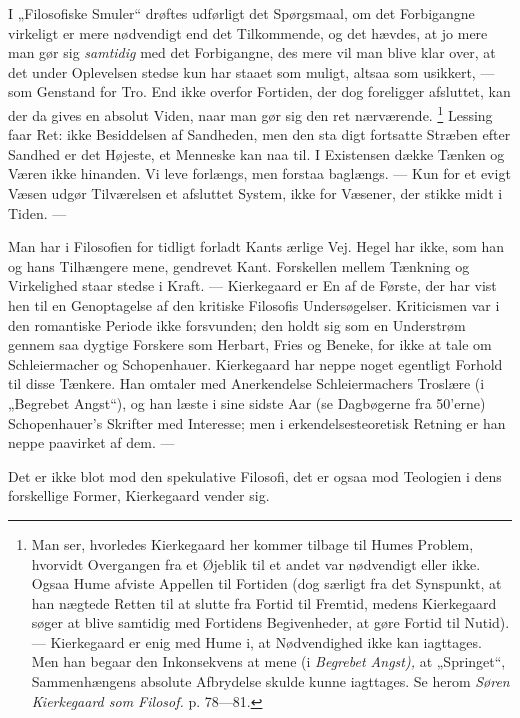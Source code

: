 \documentclass[12pt,a4paper,openany]{book}
\newcommand{\opage}[1]{\marginnote{\footnotesize\textit{[#1]}}}
\begin{document}
I „Filosofiske Smuler“ drøftes udførligt det Spørgsmaal, om det Forbigangne
virkeligt er mere nødvendigt end det Tilkommende, og det hævdes, at jo mere man
gør sig \textit{samtidig} med det Forbigangne, des mere vil man blive klar
over, at det under Oplevelsen stedse kun har staaet som muligt, altsaa som
usikkert, --- som Genstand for Tro. End ikke overfor Fortiden, der dog
foreligger afsluttet, kan der da gives en absolut Viden, naar man gør sig den
ret nærværende.%
\footnote[1]{Man ser, hvorledes Kierkegaard her kommer tilbage til Humes
Problem, hvorvidt Overgangen fra et Øjeblik til et andet var nødvendigt eller
ikke. Ogsaa Hume afviste Appellen til Fortiden (dog særligt fra det Synspunkt,
at han nægtede Retten til at slutte fra Fortid til Fremtid, medens Kierkegaard
søger at blive samtidig med Fortidens Begivenheder, at gøre Fortid til Nutid).
--- Kierkegaard er enig med Hume i, at Nødvendighed ikke kan iagttages. Men han
begaar den Inkonsekvens at mene (i \textit{Begrebet Angst),} at „Springet“,
Sammenhængens absolute Afbrydelse skulde kunne iagttages. Se herom
\textit{Søren Kierkegaard som Filosof.} p. 78---81.} Lessing faar Ret: ikke
Besiddelsen af Sandheden, men den sta%
\setcounter{footnote}{0}%
\opage{153}digt fortsatte Stræben efter Sandhed er det Højeste, et Menneske kan
naa til. I Existensen dække Tænken og Væren ikke hinanden. Vi leve forlængs,
men forstaa baglængs. --- Kun for et evigt Væsen udgør Tilværelsen et afsluttet
System, ikke for Væsener, der stikke midt i Tiden. ---

Man har i Filosofien for tidligt forladt Kants ærlige Vej. Hegel har ikke, som
han og hans Tilhængere mene, gendrevet Kant. Forskellen mellem Tænkning og
Virkelighed staar stedse i Kraft. --- Kierkegaard er En af de Første, der har
vist hen til en Genoptagelse af den kritiske Filosofis Undersøgelser.
Kriticismen var i den romantiske Periode ikke forsvunden; den holdt sig som en
Understrøm gennem saa dygtige Forskere som Herbart, Fries og Beneke, for ikke
at tale om Schleiermacher og Schopenhauer. Kierkegaard har neppe noget
egentligt Forhold til disse Tænkere. Han omtaler med Anerkendelse
Schleiermachers Troslære (i „Begrebet Angst“), og han læste i sine sidste Aar
(se Dagbøgerne fra 50'erne) Schopenhauer's Skrifter med Interesse; men i
erkendelsesteoretisk Retning er han neppe paavirket af dem. ---

Det er ikke blot mod den spekulative Filosofi, det er ogsaa mod Teologien i
dens forskellige Former, Kierkegaard vender sig.
\end{document}
